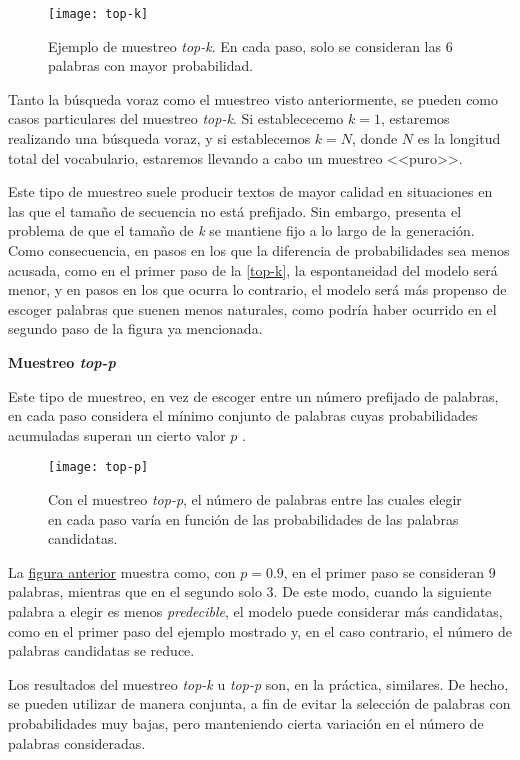 \begin{figure}[!h]
	\centering
	\texttt{[image: top-k]}
	\caption[Ejemplo de muestreo \emph{top-k}.]{Ejemplo de muestreo \emph{top-k}. En cada paso, solo se consideran las 6 palabras con mayor probabilidad.}
	\label{fig:top-k}
\end{figure}

Tanto la búsqueda voraz como el muestreo visto anteriormente, se pueden como casos particulares del muestreo \emph{top-k}. Si establececemo $k = 1$, estaremos realizando una búsqueda voraz, y si establecemos $k = N$, donde $N$ es la longitud total del vocabulario, estaremos llevando a cabo un muestreo <<puro>>.

Este tipo de muestreo suele producir textos de mayor calidad en situaciones en las que el tamaño de secuencia no está prefijado. Sin embargo, presenta el problema de que el tamaño de \emph{k} se mantiene fijo a lo largo de la generación. Como consecuencia, en pasos en los que la diferencia de probabilidades sea menos acusada, como en el primer paso de la \autoref{top-k}, la espontaneidad del modelo será menor, y en pasos en los que ocurra lo contrario, el modelo será más propenso de escoger palabras que suenen menos naturales, como podría haber ocurrido en el segundo paso de la figura ya mencionada.


\bigskip
\noindent
\textbf{Muestreo \emph{top-p}}

Este tipo de muestreo, en vez de escoger entre un número prefijado de palabras, en cada paso considera el mínimo conjunto de palabras cuyas probabilidades acumuladas superan un cierto valor $p$ \cite{holtzman20}.

\begin{figure}[!h]
	\centering
	\texttt{[image: top-p]}
	\caption[Ejemplo de muestreo \emph{top-p}.]{Con el muestreo \emph{top-p}, el número de palabras entre las cuales elegir en cada paso varía en función de las probabilidades de las palabras candidatas.}
	\label{fig:top-p}
\end{figure}

La \hyperref[top-p]{figura anterior} muestra como, con $p=0.9$, en el primer paso se consideran 9 palabras, mientras que en el segundo solo 3. De este modo, cuando la siguiente palabra a elegir es menos \emph{predecible}, el modelo puede considerar más candidatas, como en el primer paso del ejemplo mostrado y, en el caso contrario, el número de palabras candidatas se reduce.

Los resultados del muestreo \emph{top-k} u \emph{top-p} son, en la práctica, similares. De hecho, se pueden utilizar de manera conjunta, a fin de evitar la selección de palabras con probabilidades muy bajas, pero manteniendo cierta variación en el número de palabras consideradas.



